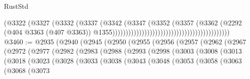 \begin{lexlean}{RustStd}
\begin{coremodule}
                                                                        (@3322
                                                                          (@3327
                                                                            (@3332
                                                                              (@3337
                                                                                (@3342
                                                                                  (@3347
                                                                                    (@3352
                                                                                      (@3357
                                                                                        (@3362
                                                                                          (@2292
                                                                                            (@404
                                                                                              @3363
                                                                                              (@407
                                                                                                @3363))
                                                                                            @1355))))))))))))))))))))))))))))))))))))))))))))
@3460 := @2935
    (@2940
      (@2945
        (@2950
          (@2955
            (@2956
              (@2957
                (@2962
                  (@2967
                    (@2972
                      (@2977
                        (@2982
                          (@2983
                            (@2988
                              (@2993
                                (@2998
                                  (@3003
                                    (@3008
                                      (@3013
                                        (@3018
                                          (@3023
                                            (@3028
                                              (@3033
                                                (@3038
                                                  (@3043
                                                    (@3048
                                                      (@3053
                                                        (@3058
                                                          (@3063
                                                            (@3068
                                                              (@3073

\end{coremodule}
\end{lexlean}
